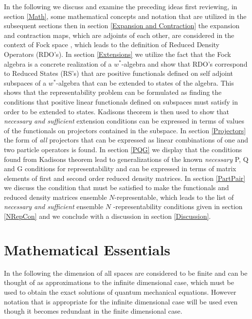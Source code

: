 \documentclass[aps,preprint]{revtex4}%
\begin{document}
In the following we discuss and examine the preceding ideas first reviewing,
in section \ref{Math}, some mathematical concepts and notation that are
utilized in the subsequent sections then in section
\ref{Expansion and Contraction} the expansion and contraction maps, which are
adjoints of each other, are considered in the context of Fock space
\cite{Kummar67,Kummar70}, which leads to the definition of Reduced Density
Operators (RDO's). In section \ref{Extensions} we utilize the fact that the
Fock algebra is a concrete realization of a $w^{\ast}$-algebra and show that
RDO's correspond to Reduced States (RS's) that are positive functionals
defined on self adjoint subspaces of a $w^{\ast}$-algebra that can be extended
to states of the algebra. This shows that the representability problem can be
formulated as finding the conditions that positive linear functionals defined
on subspaces must satisfy in order to be extended to states. Kadisons theorem
is then used to show that \emph{necessary and sufficient }extension conditions
can be expressed in terms of values of the functionals on projectors contained
in the subspace. In section \ref{Projectors} the form of \emph{all }projectors
that can be expressed as linear combinations of one and two particle operators
is found. In section \ref{PQG} we display that the conditions found from
Kadisons theorem lead to generalizations of the known \emph{necessary }P, Q
and G conditions for representability and can be expressed in terms of matrix
elements of first and second order reduced density matrices. In section
\ref{PartPair} we discuss the condition that must be satisfied to make the
functionals and reduced density matrices ensemble $N$-representable, which
leads to the list of \emph{necessary and sufficient }ensemble $N$%
-representability conditions given in section \ref{NRepCon} and we conclude
with a discussion in section \ref{Discussion}.

\section{Mathematical Essentials \label{Math}}

In the following the dimension of all spaces are considered to be finite and
can be thought of as approximations to the infinite dimensional case, which
must be used to obtain the exact solutions of quantum mechanical equations.
However notation that is appropriate for the infinite dimensional case will be
used even though it becomes redundant in the finite dimensional case.
\end{document}
